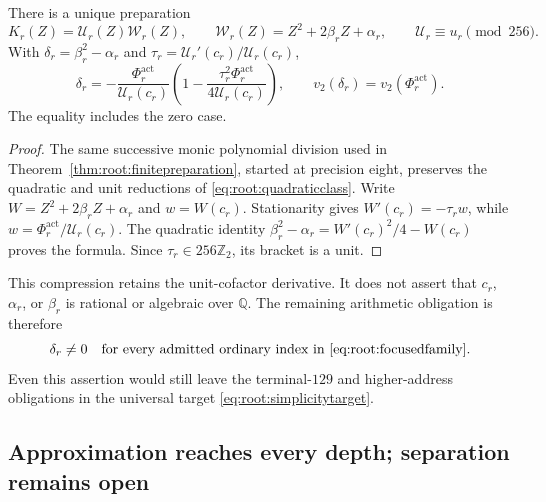 \begin{proposition}
There is a unique preparation
\[
 K_r(Z)=\mathcal U_r(Z)\mathcal W_r(Z),\qquad
 \mathcal W_r(Z)=Z^2+2\beta_rZ+\alpha_r,\qquad
 \mathcal U_r\equiv u_r\pmod{256}.
\]
With $\delta_r=\beta_r^2-\alpha_r$ and
$\tau_r=\mathcal U_r'(c_r)/\mathcal U_r(c_r)$,
\begin{equation}
 \delta_r=-\frac{\Phi_r^{\mathrm{act}}}{\mathcal U_r(c_r)}
  \left(1-\frac{\tau_r^2\Phi_r^{\mathrm{act}}}{4\mathcal U_r(c_r)}\right),
 \qquad v_2(\delta_r)=v_2(\Phi_r^{\mathrm{act}}).
 \label{eq:root:discriminant}
\end{equation}
The equality includes the zero case.
\end{proposition}
\begin{proof}
The same successive monic polynomial division used in
Theorem~\ref{thm:root:finitepreparation}, started at precision eight,
preserves the quadratic and unit reductions of
\eqref{eq:root:quadraticclass}. Write
$W=Z^2+2\beta_rZ+\alpha_r$ and $w=W(c_r)$.
Stationarity gives $W'(c_r)=-\tau_rw$, while
$w=\Phi_r^{\mathrm{act}}/\mathcal U_r(c_r)$.
The quadratic identity
$\beta_r^2-\alpha_r=W'(c_r)^2/4-W(c_r)$ proves the formula.
Since $\tau_r\in256\mathbb Z_2$, its bracket is a unit.
\end{proof}

This compression retains the unit-cofactor derivative. It does not
assert that $c_r$, $\alpha_r$, or $\beta_r$ is rational or algebraic
over $\mathbb Q$. The remaining arithmetic obligation is therefore
\begin{equation}
 \delta_r\ne0\quad\text{for every admitted ordinary index in
 \eqref{eq:root:focusedfamily}.}
 \label{eq:root:remaining}
\end{equation}
Even this assertion would still leave the terminal-$129$ and higher-address
obligations in the universal target \eqref{eq:root:simplicitytarget}.

\subsection{Approximation reaches every depth; separation remains open}
\label{app:root:approximation}

